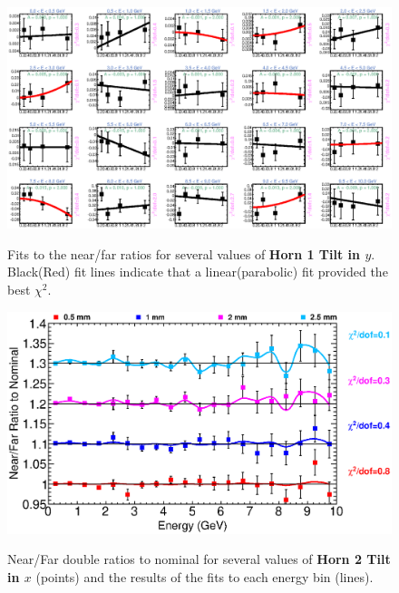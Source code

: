 \begin{figure}[ht]
  \begin{center}
    {\includegraphics[width=5.0in]{figures/Horn1YTilt_nof_fits.eps}}
  \end{center}
\caption{ Fits to the near/far ratios for several values of {\bf Horn 1 Tilt in $y$}. Black(Red) fit lines indicate that a linear(parabolic) fit provided the best $\chi^2$. }
\end{figure}



\begin{figure}[ht]
  \begin{center}
    {\includegraphics[width=6.0in]{figures/Horn2XTilt_nof_summary.eps}}
  \end{center}
\caption{ Near/Far double ratios to nominal for several values of {\bf Horn 2 Tilt in $x$} (points) and the results of the fits to each energy bin (lines).}
\end{figure}

